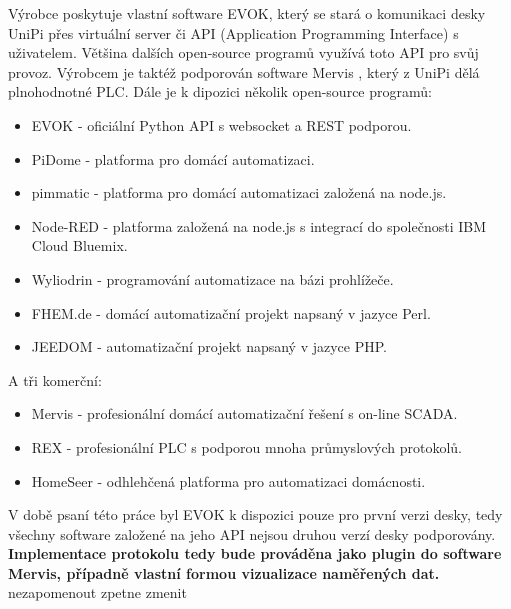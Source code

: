 Výrobce poskytuje vlastní software EVOK, který se stará o komunikaci desky UniPi přes virtuální server či API (Application Programming Interface) s uživatelem. Většina dalších open-source programů využívá toto API pro svůj provoz. Výrobcem je taktéž podporován software Mervis \cite{MervisWeb}, který z UniPi dělá plnohodnotné PLC. Dále je k dipozici několik open-source programů:
\begin{itemize}
\item EVOK - oficiální Python API s websocket a REST podporou.
\item PiDome - platforma pro domácí automatizaci.
\item pimmatic - platforma pro domácí automatizaci založená na node.js.
\item Node-RED - platforma založená na node.js s integrací do společnosti IBM Cloud Bluemix.
\item Wyliodrin - programování automatizace na bázi prohlížeče.
\item FHEM.de - domácí automatizační projekt napsaný v jazyce Perl.
\item JEEDOM - automatizační projekt napsaný v jazyce PHP.
\end{itemize}
A tři komerční:
\begin{itemize}
\item Mervis - profesionální domácí automatizační řešení s on-line SCADA.
\item REX - profesionální PLC s podporou mnoha průmyslových protokolů.
\item HomeSeer - odhlehčená platforma pro automatizaci domácnosti.
\end{itemize}

V době psaní této práce byl EVOK k dispozici pouze pro první verzi desky, tedy všechny software založené na jeho API nejsou druhou verzí desky podporovány. \textcolor[rgb]{0,1,0}{\textbf{Implementace protokolu tedy bude prováděna jako plugin do software Mervis, případně vlastní formou vizualizace naměřených dat.}}
\colorbox[rgb]{0,1,0}{nezapomenout zpetne zmenit}




 